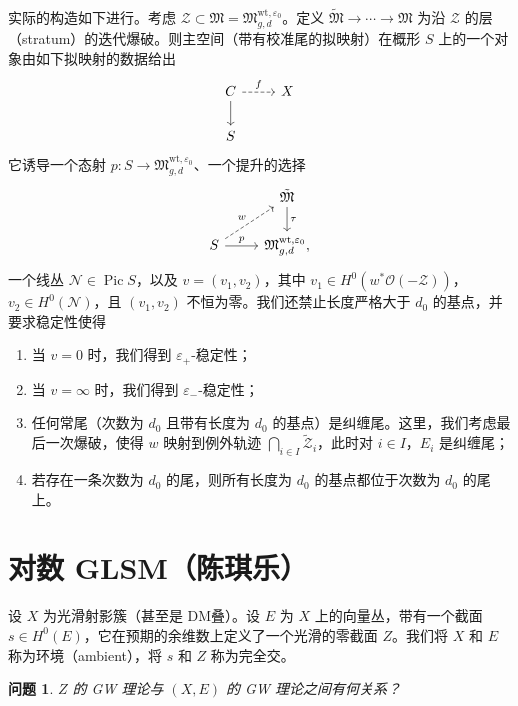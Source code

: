 \documentclass{amsart}
\newtheorem{quest}[thm]{问题}
\theoremstyle{definition}
\theoremstyle{remark}
\theoremstyle{plain}
\theoremstyle{definition}
\theoremstyle{remark}
\newcommand{\ep}{\varepsilon}
\newcommand{\mc}[1]{\mathcal{#1}}
\newcommand{\mf}[1]{\mathfrak{#1}}
\newcommand{\mr}[1]{\mathrm{#1}}
\newcommand{\1}{\mathbf{1}}
\newcommand{\2}{\mathbf{2}}
\newcommand{\3}{\mathbf{3}}
\DeclareMathOperator{\Pic}{Pic}
\begin{document}
实际的构造如下进行。考虑 \(\mc{Z} \subset \mf{M} = \mf{M}_{g,d}^{\mr{wt}, \ep_0}\)。定义 \(\tilde{\mf{M}} \to \cdots \to \mf{M}\) 为沿 \(\mc{Z}\) 的层（stratum）的迭代爆破。则主空间（带有校准尾的拟映射）在概形 \(S\) 上的一个对象由如下拟映射的数据给出
\begin{equation*}
\begin{tikzcd}
    C \ar{d} \ar[dashrightarrow]{r}{f} & X \\
    S
\end{tikzcd}
\end{equation*}
它诱导一个态射 \(p \colon S \to \mf{M}_{g,d}^{\mr{wt}, \ep_0}\)、一个提升的选择
\begin{equation*}
\begin{tikzcd}
    & \tilde{\mf{M}} \ar{d}{\tau} \\
    S \ar{r}{p} \ar[dashrightarrow]{ur}{w} & \mf{M}_{g,d}^{\mr{wt}, \ep_0},
\end{tikzcd}
\end{equation*}
一个线丛 \(\mc{N} \in \Pic S\)，以及 \(v = (v_1, v_2)\)，其中 \(v_1 \in H^0(w^* \mc{O}(-\mc{Z}))\)，\(v_2 \in H^0(\mc{N})\)，且 \((v_1, v_2)\) 不恒为零。我们还禁止长度严格大于 \(d_0\) 的基点，并要求稳定性使得
\begin{enumerate}
    \item 当 \(v = 0\) 时，我们得到 \(\ep_+\)-稳定性；
    \item 当 \(v = \infty\) 时，我们得到 \(\ep_-\)-稳定性；
    \item 任何常尾（次数为 \(d_0\) 且带有长度为 \(d_0\) 的基点）是纠缠尾。这里，我们考虑最后一次爆破，使得 \(w\) 映射到例外轨迹 \(\bigcap_{i \in I} \tilde{\mc{Z}}_i\)，此时对 \(i \in I\)，\(E_i\) 是纠缠尾；
    \item 若存在一条次数为 \(d_0\) 的尾，则所有长度为 \(d_0\) 的基点都位于次数为 \(d_0\) 的尾上。
\end{enumerate}
\section{对数 GLSM（陈琪乐）}%
\label{sec:Log GLSM (Qile Chen)}

设 \(X\) 为光滑射影簇（甚至是 DM叠）。设 \(E\) 为 \(X\) 上的向量丛，带有一个截面 \(s \in H^0(E)\)，它在预期的余维数上定义了一个光滑的零截面 \(Z\)。我们将 \(X\) 和 \(E\) 称为环境（ambient），将 \(s\) 和 \(Z\) 称为完全交。

\begin{quest}
    \(Z\) 的 GW 理论与 \((X, E)\) 的 GW 理论之间有何关系？
\end{quest}
\end{document}
